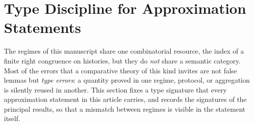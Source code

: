 \documentclass[12pt]{article}
\theoremstyle{definition}
\begin{document}
\section{Type Discipline for Approximation Statements}
\label{sec:type-discipline}

The regimes of this manuscript share one combinatorial resource, the index of
a finite right congruence on histories, but they do \emph{not} share a
semantic category.  Most of the errors that a comparative theory of this kind
invites are not false lemmas but \emph{type errors}: a quantity proved in one
regime, protocol, or aggregation is silently reused in another.  This section
fixes a type signature that every approximation statement in this article
carries, and records the signatures of the principal results, so that a
mismatch between regimes is visible in the statement itself.
\end{document}
